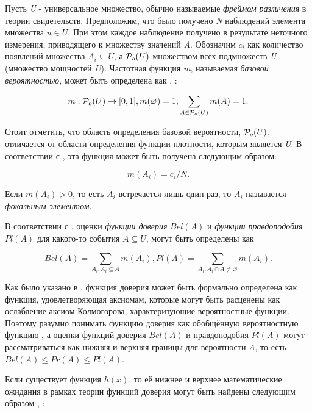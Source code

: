 \documentclass[12pt,a4paper,oneside]{article}
\begin{document}
\par
Пусть \emph{U} - универсальное множество, обычно называемые \emph{фреймом различения} в теории свидетельств. 
Предположим, что было получено \emph{N} наблюдений элемента множества \(u \in U\).
При этом каждое наблюдение получено в результате неточного измерения, приводящего к множеству значений \emph{A}.
Обозначим \(c_i\) как количество появлений множества \(A_i \subseteq U\), а \(\mathcal{P}_o(U)\) множеством всех подмножеств \emph{U} (множество мощностей \emph{U}).
Частотная функция \emph{m}, называемая \emph{базовой вероятностью}, может быть определена как , :

\[
m : \mathcal{P}_o(U) \to [0,1],
m(\varnothing) = 1, \sum \limits_{A \in \mathcal{P}_o(U)} m(A) = 1.
\]

\par
Стоит отметить, что область определения базовой вероятности, \(\mathcal{P}_o(U)\), отличается от области определения функции плотности, которым является \emph{U}. 
В соответствии с , эта функция может быть получена следующим образом:

\[
m(A_i) = c_i / N.
\]

\par
Если \(m(A_i) > 0\), то есть \(A_i\) встречается лишь один раз, то \(A_i\) называется \emph{фокальным элементом}. 

\par
В соответствии с , оценки \emph{функции доверия} \(Bel(A)\) и \emph{функции правдоподобия} \(Pl(A)\) для какого-то события \(A \subseteq U\), могут быть определены как

\[
Bel(A) = \sum \limits_{A_i: A_i \subseteq A} m(A_i), 
Pl(A) = \sum \limits_{A_i: A_i \cap A \neq \varnothing} m(A_i).
\]

Как было указано в , функция доверия может быть формально определена как функция, удовлетворяющая аксиомам, которые могут быть расценены как ослабление аксиом Колмогорова, характеризующие вероятностные функции. 
Поэтому разумно понимать функцию доверия как обобщённую вероятностную функцию , а оценки функций доверия \(Bel(A)\) и правдоподобия \(Pl(A)\) могут рассматриваться как нижняя и верхняя границы для вероятности \emph{A}, то есть \(Bel(A) \leq Pr(A) \leq Pl(A)\).

\par
Если существует функция \(h(x)\), то её нижнее и верхнее математические ожидания в рамках теории функций доверия могут быть найдены следующим образом , :
\end{document}
